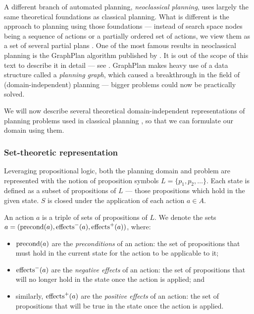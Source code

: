 A different branch of automated planning, \textit{neoclassical planning},
uses largely the same theoretical foundations as classical 
planning. What is different is the approach to planning using those foundations
--- instead of search space nodes being a sequence of actions or a partially ordered
set of actions, we view them as a set of several partial plans
\citep[Part~II]{Ghallab2004}.
One of the most famous results in neoclassical planning is the GraphPlan algorithm
published by \citet{Blum1997}. It is out of the scope of this text to describe it in detail
--- see \citet[Section~6.3]{Ghallab2004}.
GraphPlan makes heavy use of a data structure called a \textit{planning graph},
which caused a breakthrough in the field of (domain-independent) planning
--- bigger problems could now be practically solved.

We will now describe several theoretical domain-independent representations
of planning problems used in classical planning \citep[Chapter~2]{Ghallab2004},
so that we can formulate our domain using them.

\subsubsection{Set-theoretic representation}

Leveraging propositional logic, both the planning domain and problem
are represented with the notion
of proposition symbols $L = \{p_1, p_2, \ldots\}$.
Each state is defined as a subset of propositions of $L$ --- those propositions
which hold in the given state. $S$ is closed under the application of each
action $a \in A$.

An action $a$
is a triple of sets of propositions of $L$.
We denote the sets $a = (\operatorname{\textrm{precond}}(a), \operatorname{\textrm{effects}}^-(a), \operatorname{\textrm{effects}}^+(a))$, where:
\begin{itemize}
\item $\operatorname{\textrm{precond}}(a)$ are the \textit{preconditions} of an action: the set of
propositions that must hold in the current state for the action to be applicable to it;
\item $\operatorname{\textrm{effects}}^-(a)$ are the \textit{negative effects} of an action:
the set of propositions
that will no longer hold in the state once the action is applied; and
\item similarly, $\operatorname{\textrm{effects}}^+(a)$ are the \textit{positive effects} of an action:
the set of propositions that will be true in the state once the action is applied.
\end{itemize}

